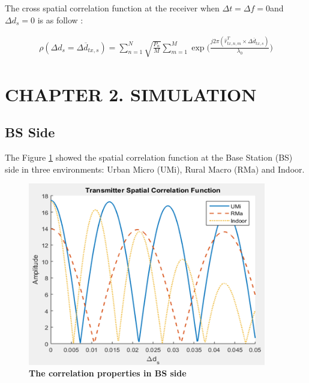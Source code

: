 \documentclass{article} %
\begin{document}
The cross spatial correlation function at the receiver when $\Delta t = \Delta f = 0$and $\Delta d_s = 0$ is as follow \cite{final_exam}:
\begin{adjustwidth}{-2cm}{0cm}
\begin{equation} \label{ptMS}
\begin{split}
    \rho(\Delta d_s = \Delta \overline d_{tx,s}) = \sum_{n=1}^N \sqrt{\frac{P_n}{M}} \sum_{m=1}^M \exp \Big(\frac{j2\pi(\hat{r}_{tx,n,m}^T \times \Delta \overline{d}_{tx,s})}{\lambda_0} \Big)
\end{split}
\end{equation}
\end{adjustwidth}

\clearpage

\section*{CHAPTER 2. SIMULATION}
\setcounter{section}{2}
\setcounter{figure}{0}
\setcounter{table}{0}
\setcounter{subsection}{0}

\subsection{BS Side}

The Figure \ref{figure2} showed the spatial correlation function at the Base Station (BS) side in three environments: Urban Micro (UMi), Rural Macro (RMa) and Indoor. 

\begin{figure}[!ht]
    \centering
    \includegraphics[height=8cm]{Images/figure2.png}
    \caption[The correlation properties in BS side~\cite{final_exam}]{\bfseries \fontsize{12pt}{0pt}\selectfont The correlation properties in BS side~\cite{final_exam}}
    \label{figure2}
\end{figure}
\end{document}
